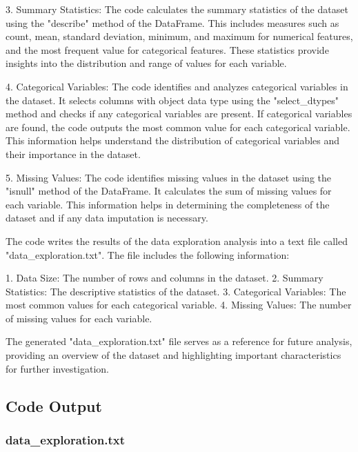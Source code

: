 \documentclass[11pt]{article}
\begin{document}
3. Summary Statistics: The code calculates the summary statistics of the dataset using the "describe" method of the DataFrame. This includes measures such as count, mean, standard deviation, minimum, and maximum for numerical features, and the most frequent value for categorical features. These statistics provide insights into the distribution and range of values for each variable.

4. Categorical Variables: The code identifies and analyzes categorical variables in the dataset. It selects columns with object data type using the "select\_dtypes" method and checks if any categorical variables are present. If categorical variables are found, the code outputs the most common value for each categorical variable. This information helps understand the distribution of categorical variables and their importance in the dataset.

5. Missing Values: The code identifies missing values in the dataset using the "isnull" method of the DataFrame. It calculates the sum of missing values for each variable. This information helps in determining the completeness of the dataset and if any data imputation is necessary.

The code writes the results of the data exploration analysis into a text file called "data\_exploration.txt". The file includes the following information:

1. Data Size: The number of rows and columns in the dataset.
2. Summary Statistics: The descriptive statistics of the dataset.
3. Categorical Variables: The most common values for each categorical variable.
4. Missing Values: The number of missing values for each variable.

The generated "data\_exploration.txt" file serves as a reference for future analysis, providing an overview of the dataset and highlighting important characteristics for further investigation.

\subsection{Code Output}

\subsubsection*{data\_exploration.txt}
\end{document}
